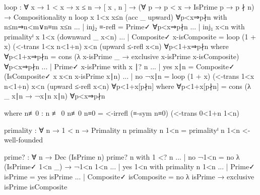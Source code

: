 \documentclass[./Thesis.tex]{subfiles}
\begin{document}
\begin{code}
    loop
      : ∀ x → 1 < x → x ≤ n → [ x , n ]
      → (∀ {p} → p < x → IsPrime p → p ∤ n)
      → Compositionality n
    loop x 1<x x≤n (acc _ upward) ∀p<x⇒p∤n with n≤m⇒n<m∨n≡m x≤n
    ... | inj₂ ≡-refl = Prime✓ ∀p<x⇒p∤n
    ... | inj₁ x<n with primalityⁱ x 1<x (downward _ x<n)
    ...   | Composite✓ x-isComposite = loop (1 + x) (<-trans 1<x n<1+n) x<n (upward ≤-refl x<n) ∀p<1+x⇒p∤n
            where ∀p<1+x⇒p∤n = cons (λ x-isPrime _ → exclusive x-isPrime x-isComposite) ∀p<x⇒p∤n
    ...   | Prime✓ x-isPrime with x ∣? n
    ...     | yes x∣n = Composite✓ (IsComposite✓ x x<n x-isPrime x∣n)
    ...     | no ¬x∣n = loop (1 + x) (<-trans 1<x n<1+n) x<n (upward ≤-refl x<n) ∀p<1+x[p∤n]
            where ∀p<1+x[p∤n] = cons (λ _ x∣n → ¬x∣n x∣n) ∀p<x⇒p∤n
\end{code}
\begin{code}[hide]
    where
    n≢0 : n ≢ 0
    n≢0 n≡0 = <-irrefl (≡-sym n≡0) (<-trans 0<1+n 1<n)
\end{code}
\begin{code}
  primality : ∀ n → 1 < n → Primality n
  primality n 1<n = primalityⁱ n 1<n <-well-founded
\end{code}
\begin{code}
  prime? : ∀ n → Dec (IsPrime n)
  prime? n with 1 <? n
  ... | no ¬1<n = no λ { (IsPrime✓ 1<n _) → ¬1<n 1<n }
  ... | yes 1<n with primality n 1<n
  ... | Prime✓ isPrime = yes isPrime
  ... | Composite✓ isComposite = no λ { isPrime → exclusive isPrime isComposite }
\end{code}
\end{document}
